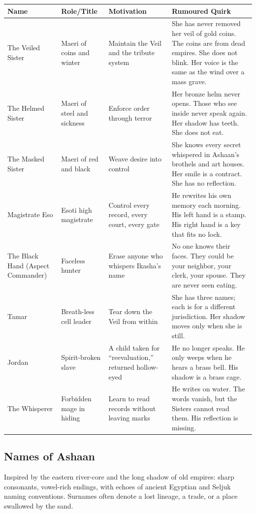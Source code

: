 \begin{longtable}{|p{}|p{}|p{}|p{}|}
\hline
\textbf{Name} & \textbf{Role/Title} & \textbf{Motivation} & \textbf{Rumoured Quirk} \\
\hline
The Veiled Sister & Maeri of coins and winter & Maintain the Veil and the tribute system & She has never removed her veil of gold coins. The coins are from dead empires. She does not blink. Her voice is the same as the wind over a mass grave. \\
\hline
The Helmed Sister & Maeri of steel and sickness & Enforce order through terror & Her bronze helm never opens. Those who see inside never speak again. Her shadow has teeth. She does not eat. \\
\hline
The Masked Sister & Maeri of red and black & Weave desire into control & She knows every secret whispered in Ashaan's brothels and art houses. Her smile is a contract. She has no reflection. \\
\hline
Magistrate Eso & Esoti high magistrate & Control every record, every court, every gate & He rewrites his own memory each morning. His left hand is a stamp. His right hand is a key that fits no lock. \\
\hline
The Black Hand (Aspect Commander) & Faceless hunter & Erase anyone who whispers Ikasha's name & No one knows their faces. They could be your neighbor, your clerk, your spouse. They are never seen eating. \\
\hline
Tamar & Breath-less cell leader & Tear down the Veil from within & She has three names; each is for a different jurisdiction. Her shadow moves only when she is still. \\
\hline
Jordan & Spirit-broken slave & A child taken for ``reevaluation,'' returned hollow-eyed & He no longer speaks. He only weeps when he hears a brass bell. His shadow is a brass cage. \\
\hline
The Whisperer & Forbidden mage in hiding & Learn to read records without leaving marks & He writes on water. The words vanish, but the Sisters cannot read them. His reflection is missing. \\
\hline
\end{longtable}

\subsection*{Names of Ashaan}
\label{sec:ashaan-names}

Inspired by the eastern river-core and the long shadow of old empires: sharp consonants, vowel-rich endings, with echoes of ancient Egyptian and Seljuk naming conventions. Surnames often denote a lost lineage, a trade, or a place swallowed by the sand.

